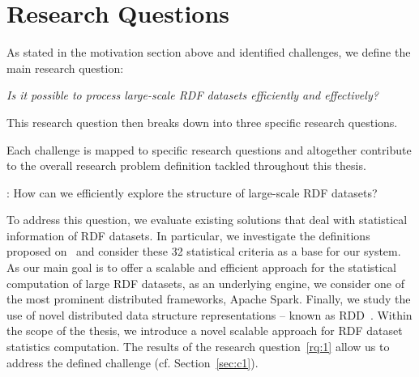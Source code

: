 

\section{Research Questions}
\label{sec:research-questions}

As stated in the motivation section above and identified challenges, we define the main research question:

\begin{tcolorbox}
\centering
\textit{Is it possible to process large-scale \gls{RDF} datasets efficiently and effectively?}
\end{tcolorbox}

This research question then breaks down into three specific research questions.

Each challenge is mapped to specific research questions and altogether contribute to the overall research problem definition tackled throughout this thesis.

\begin{tcolorbox}
\textbf{\rqNr[RQ1]\label{rq:1}}: How can we efficiently explore the structure of large-scale \gls{RDF} datasets?
\end{tcolorbox}

To address this question, we evaluate existing solutions that deal with statistical information of \gls{RDF} datasets.
In particular, we investigate the definitions proposed on~\cite{demter-2012-ekaw} and consider these 32 statistical criteria as a base for our system.
As our main goal is to offer a scalable and efficient approach for the statistical computation of large \gls{RDF} datasets, as an underlying engine, we consider one of the most prominent distributed frameworks, Apache Spark.
Finally, we study the use of novel distributed data structure representations -- known as \gls{RDD}~\cite{zaharia2012resilient}.
Within the scope of the thesis, we introduce a novel scalable approach for \gls{RDF} dataset statistics computation.
The results of the research question~\ref{rq:1} allow us to address the defined challenge (cf. Section~\ref{sec:c1}).

